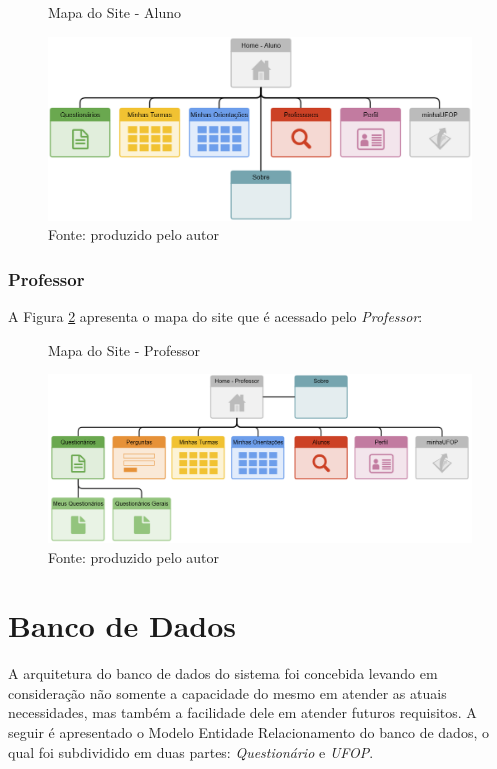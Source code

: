 \documentclass[
  12pt,       %
  openright,      %
  oneside,      %
  a4paper,      %
  english,      %
  french,        %
  spanish,     %
  brazil        %
  ]{abntex2-decsi}
\begin{document}
        \begin{figure}[h]	
            \centering
            \caption{Mapa do Site - Aluno}						   \label{fig:websitemap_student}
            \includegraphics[width=1\textwidth]{img/websitemap_student}
            \caption*{Fonte: produzido pelo autor}
    	\end{figure}
        
        \subsubsection{Professor}
        
        A Figura \ref{fig:websitemap_professor} apresenta o mapa do site que é acessado pelo \textit{Professor}:
		
        \begin{figure}[h]	
            \centering
            \caption{Mapa do Site - Professor}						   \label{fig:websitemap_professor}
            \includegraphics[width=1\textwidth]{img/websitemap_professor1}
            \caption*{Fonte: produzido pelo autor}
    	\end{figure}
    
    \newpage
    
\section{Banco de Dados}

A arquitetura do banco de dados do sistema foi concebida levando em consideração não somente a capacidade do mesmo em atender as atuais necessidades, mas também a facilidade dele em atender futuros requisitos. A seguir é apresentado o Modelo Entidade Relacionamento do banco de dados, o qual foi subdividido em duas partes: \textit{Questionário} e \textit{UFOP}.
\end{document}
